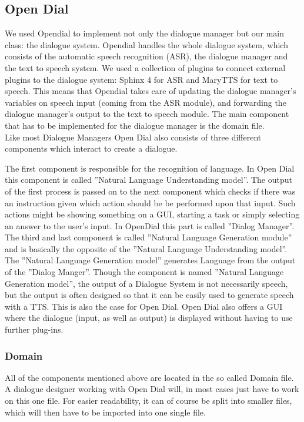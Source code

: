 \subsection{Open Dial}

We used Opendial to implement not only the dialogue manager but our main class: the dialogue system. 
Opendial handles the whole dialogue system, which consists of the automatic speech recognition (ASR), the dialogue manager and the text to speech system. 
We used a collection of plugins to connect external plugins to the dialogue system: Sphinx 4 for ASR and MaryTTS for text to speech. 
This means that Opendial takes care of updating the dialogue manager's variables on speech input (coming from the ASR module), and forwarding the dialogue manager's output to the text to speech module. 
The main component that has to be implemented for the dialogue manager is the domain file. \\

Like most Dialogue Managers Open Dial also consists of three different components which interact to create a dialogue. 

The first component is responsible for the recognition of language. 
In Open Dial this component is called ”Natural Language Understanding model”. 
The output of the first process is passed on to the next component which checks if there was an instruction given which action should be  be performed upon that input. 
Such actions might be showing something on a GUI, starting a task or simply selecting an answer to the user's input. 
In OpenDial this part is called ”Dialog Manager”.
The third and last component is called ”Natural Language Generation module” and is basically the opposite of the ”Natural Language Understanding model”. 
The ”Natural Language Generation model” generates Language from the output of the ”Dialog Manger”. 
Though the component is named ”Natural Language Generation model”, the output of a Dialogue System is not necessarily speech, but the output is often designed so that it can be easily used to generate speech with a TTS. 
This is also the case for Open Dial. 
Open Dial also offers a GUI where the dialogue (input, as well as output) is displayed without having to use further plug-ins.

\subsubsection{Domain}

All of the components mentioned above are located in the so called Domain file.
A dialogue designer working with Open Dial will, in most cases just have to work on this one file. 
For easier readability, it can of course be split into smaller files, which will then have to be imported into one single file. \newline

